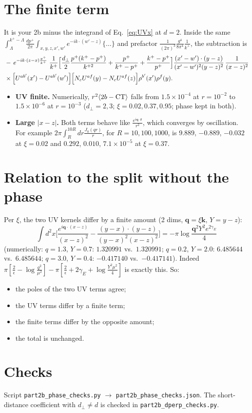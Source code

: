 \documentclass[10pt]{article}
\numberwithin{equation}{section}
\newcommand{\phx}{e^{-ik\cdot(z-x)\frac{p^{+}}{k^{+}}}}
\begin{document}
\section{The finite term}
It is your 2b minus the integrand of Eq.~\eqref{eq:UVx} at $d=2$. Inside the same $\int_\Lambda^{k^+-\Lambda}\frac{dp^+}{2\pi}\int_{x,y,z,x',w'}e^{-ik\cdot(w'-z)}\{\dots\}$ and prefactor $\frac{1}{(2\pi)^3}\frac{g^4}{8\pi^4}\frac{1}{k^+}$, the subtraction is
\begin{align}
&-\,\phx\;\frac{1}{k^{+}}\Big[\frac{d_\perp}{2}\frac{p^{+}(k^{+}-p^{+})}{k^{+2}}+\frac{p^{+}}{k^{+}-p^{+}}+\frac{k^{+}-p^{+}}{p^{+}}\Big]\frac{(x'-w')\cdot(y-z)}{(x'-w')^{2}(y-z)^{2}}\,\frac{1}{(x-z)^{2}}\notag\\
&\times\Big[U^{ab'}(x')-U^{ab'}(w')\Big]\Big[N_cU^{af}(y)-N_cU^{af}(z)\Big]\rho^{b'}(x')\rho^{f}(y).
\end{align}
\begin{itemize}
\item \textbf{UV finite.} Numerically, $r^2\langle2b-{\rm CT}\rangle$ falls from $1.5\times10^{-4}$ at $r=10^{-2}$ to $1.5\times10^{-6}$ at $r=10^{-3}$ ($d_\perp=2,3$; $\xi=0.02,0.37,0.95$; phase kept in both).
\item \textbf{Large $|x-z|$.} Both terms behave like $\frac{e^{i\mathbf q\cdot\mathbf r}}{r^2}$, which converges by oscillation. For example $2\pi\int_R^{10R}dr\frac{J_0(qr)}{r}$, for $R=10,100,1000$, is $9.889$, $-0.889$, $-0.032$ at $\xi=0.02$ and $0.292$, $0.010$, $7.1\times10^{-5}$ at $\xi=0.37$.
\end{itemize}

\section{Relation to the split without the phase}
Per $\xi$, the two UV kernels differ by a finite amount (2 dims, $\mathbf q=\xi\mathbf k$, $Y=y-z$):
\begin{equation}
\int d^2x\Big[\frac{e^{i\mathbf q\cdot(x-z)}}{(x-z)^2}-\frac{(y-x)\cdot(y-z)}{(y-x)^2(x-z)^2}\Big]=-\pi\log\frac{\mathbf q^2Y^2e^{2\gamma_E}}{4}
\end{equation}
(numerically: $q=1.3$, $Y=0.7$: $1.320991$ vs.\ $1.320991$; $q=0.2$, $Y=2.0$: $6.485644$ vs.\ $6.485644$; $q=3.0$, $Y=0.4$: $-0.417140$ vs.\ $-0.417141$). Indeed $\pi[\frac2\epsilon-\log\frac{q^2}{\mu^2}]-\pi[\frac2\epsilon+2\gamma_E+\log\frac{Y^2\mu^2}{4}]$ is exactly this. So:
\begin{itemize}
\item the poles of the two UV terms agree;
\item the UV terms differ by a finite term;
\item the finite terms differ by the opposite amount;
\item the total is unchanged.
\end{itemize}

\section*{Checks}
Script \texttt{part2b\_phase\_checks.py} $\to$ \texttt{part2b\_phase\_checks.json}. The short-distance coefficient with $d_\perp\neq d$ is checked in \texttt{part2b\_dperp\_checks.py}.
\end{document}
